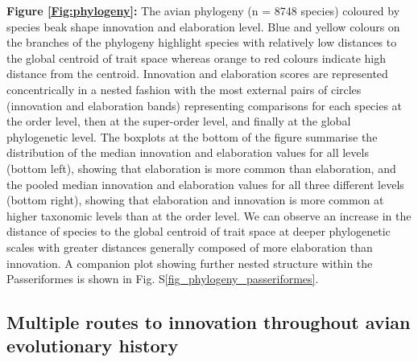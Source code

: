\documentclass[12pt,letterpaper]{article}
\begin{document}
\noindent \textbf{Figure \ref{Fig:phylogeny}:}
The avian phylogeny (n = 8748 species) coloured by species beak shape innovation and elaboration level.
Blue and yellow colours on the branches of the phylogeny highlight species with relatively low distances to the global centroid of trait space whereas orange to red colours indicate high distance from the centroid.
Innovation and elaboration scores are represented concentrically in a nested fashion with the most external pairs of circles (innovation and elaboration bands) representing comparisons for each species at the order level, then at the super-order level, and finally at the global phylogenetic level.
The boxplots at the bottom of the figure summarise the distribution of the median innovation and elaboration values for all levels (bottom left), showing that elaboration is more common than elaboration,
and the pooled median innovation and elaboration values for all three different levels (bottom right), showing that elaboration and innovation is more common at higher taxonomic levels than at the order level.
We can observe an increase in the distance of species to the global centroid of trait space at deeper phylogenetic scales with greater distances generally composed of more elaboration than innovation.
A companion plot showing further nested structure within the Passeriformes is shown in Fig. S\ref{fig_phylogeny_passeriformes}. 

\subsection{Multiple routes to innovation throughout avian evolutionary history}
\end{document}
